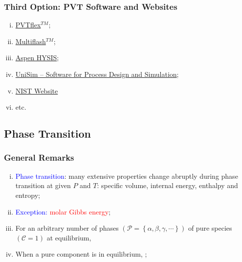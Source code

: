 \documentclass[10pt,compress,handout,unknownkeysallowed]{beamer}
\begin{document}
\begin{frame}
  \frametitle{Third Option: PVT Software and Websites}
\noindent
\begin{enumerate}[i)]
   \item<1-> \href{http://www.weatherford.com/doc/wft183650}{PVTflex$^{TM}$};
   \item<1-> \href{http://www.kbcat.com/infochem-software/flow-assurance-software-multiflash/pvt-simulation}{Multiflash$^{TM}$};
   \item<1-> \href{http://home.aspentech.com/products/engineering/aspen-hysys}{Aspen HYSIS};
   \item<1-> \href{https://www.honeywellprocess.com/en-US/explore/products/advanced-applications/unisim/Pages/default.aspx}{UniSim – Software for Process Design and Simulation};
   \item<1-> \href{http://webbook.nist.gov/chemistry/fluid/}{NIST Website}
   \item<1-> etc.
\end{enumerate}

\end{frame}


\subsection{Phase Transition}
\begin{frame}
  \frametitle{General Remarks}
     \begin{enumerate}[i)]
         \item<1-> \textcolor{blue}{Phase transition}: many extensive properties change abruptly during phase transition at given $P$ and $T$: specific volume, internal energy, enthalpy and entropy;
         \item<2-> \textcolor{blue}{Exception:} \textcolor{red}{molar Gibbs energy};
         \item<3-> For an arbitrary number of phases $\left(\mathcal{P}=\left\{\alpha, \beta, \gamma, \cdots\right\}\right)$ of pure species $\left(\mathcal{C}=1\right)$ at equilibrium,
         \item<4-> When a pure component is in equilibrium, ;
     \end{enumerate}

\end{frame}
\normalsize
\end{document}
